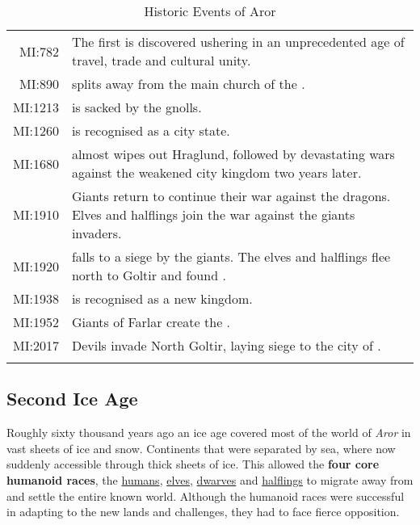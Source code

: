 \begin{longtable}{@{\,}r <{\hskip 6pt} !{
  \color{LightSteelBlue3}
  \makebox[0pt]{\textbullet}
  \hskip -2.6pt
  \vrule width 1pt
  \hspace{\labelsep}
  }
  >{\raggedright\arraybackslash}p{11cm}
}
    MI:782           & The first  is discovered
                       ushering in an unprecedented age of travel, trade and
                       cultural unity. \\
    MI:890           &  splits away from the
                       main church of the . \\
    MI:1213          &  is sacked by the gnolls. \\
    MI:1260          &  is recognised as a city state. \\
    MI:1680          &  almost wipes out
                       Hraglund, followed by devastating wars against the
                       weakened city kingdom two years later. \\
    MI:1910          & Giants return to continue their war against the dragons.
                       Elves and halflings join the war against the giants
                       invaders. \\
    MI:1920          &  falls to a siege by the giants.
                       The elves and halflings flee north to Goltir and found
                       . \\
    MI:1938          &  is recognised as a new kingdom. \\
    MI:1952          & Giants of Farlar create the . \\
    MI:2017          & Devils invade North Goltir, laying siege to the city
                       of . \\
  \caption{Historic Events of Aror}
\end{longtable}
\twocolumn
\clearpage

\subsection{Second Ice Age}
\label{sec:Second Ice Age}

Roughly sixty thousand years ago an ice age covered most of the world
of \emph{Aror} in vast sheets of ice and snow. Continents that were separated
by sea, where now suddenly accessible through thick sheets of ice. This
allowed the \textbf{four core humanoid races}, the
\hyperref[sec:Humans]{humans}, \hyperref[sec:Elves]{elves},
\hyperref[sec:Dwarves]{dwarves} and \hyperref[sec:Halflings]{halflings}
to migrate away from  and settle the entire known
world. Although the humanoid races were successful in adapting to the new
lands and challenges, they had to face fierce opposition.

